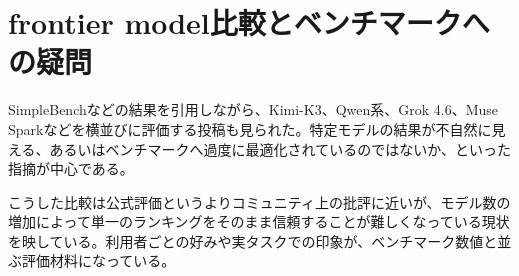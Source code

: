 \section{frontier model比較とベンチマークへの疑問}

SimpleBenchなどの結果を引用しながら、Kimi-K3、Qwen系、Grok 4.6、Muse Sparkなどを横並びに評価する投稿も見られた。特定モデルの結果が不自然に見える、あるいはベンチマークへ過度に最適化されているのではないか、といった指摘が中心である。

こうした比較は公式評価というよりコミュニティ上の批評に近いが、モデル数の増加によって単一のランキングをそのまま信頼することが難しくなっている現状を映している。利用者ごとの好みや実タスクでの印象が、ベンチマーク数値と並ぶ評価材料になっている。
